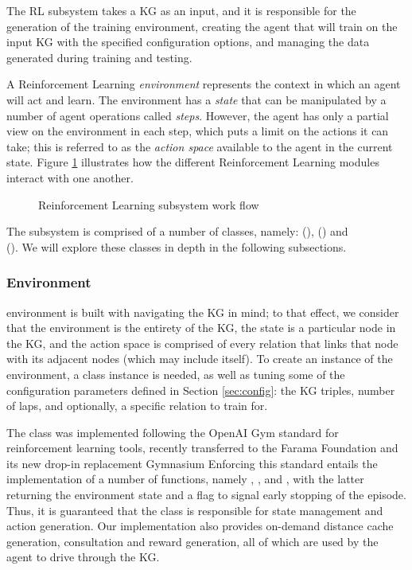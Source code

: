 The RL subsystem takes a KG as an input, and it is responsible for the generation of the training environment, creating the agent that will train on the input KG with the specified configuration options, and managing the data generated during training and testing. 

A Reinforcement Learning \emph{environment} represents the context in which an agent will act and learn. The environment has a \emph{state} that can be manipulated by a number of agent operations called \emph{steps}. However, the agent has only a partial view on the environment in each step,  which puts a limit on the actions it can take; this is referred to as the \emph{action space} available to the agent in the current state. Figure \ref{fig:rl_flow} illustrates how the different Reinforcement Learning modules interact with one another.


\begin{figure}[!h]
    \centering
    
    \caption{Reinforcement Learning subsystem work flow}
    \label{fig:rl_flow}
\end{figure}

The subsystem is comprised of a number of classes, namely:   (),  () and  \\(). We will explore these classes in depth in the following subsections.

\subsubsection{Environment}

\toolname{} environment is built with navigating the KG in mind; to that effect, we consider that the environment is the entirety of the KG, the state is a particular node in the KG, and the action space is comprised of every relation that links that node with its adjacent nodes (which may include itself).
To create an instance of the environment, a  class instance is needed, as well as tuning some of the configuration parameters defined in Section \ref{sec:config}: the KG triples, number of laps, and optionally, a specific relation to train for.

The  class was implemented following the OpenAI Gym 
standard for reinforcement learning tools, recently transferred to the Farama Foundation and its new drop-in replacement Gymnasium
Enforcing this standard entails the implementation of a number of functions, namely , ,  and , with the latter returning the environment state and a  flag to signal early stopping of the episode. Thus, it is guaranteed that the  class is responsible for state management and action generation. Our implementation also provides on-demand distance cache generation, consultation and reward generation, all of which are used by the agent to drive through the KG.


